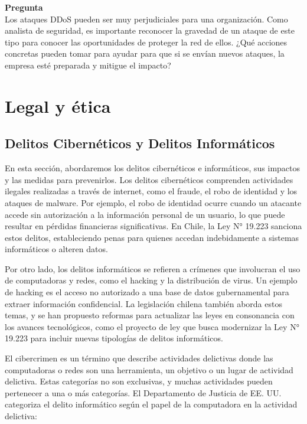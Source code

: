 

\textbf{Pregunta}\\
Los ataques DDoS pueden ser muy perjudiciales para una organización. Como analista de seguridad, es importante reconocer la gravedad de un ataque de este tipo para conocer las oportunidades de proteger la red de ellos. ¿Qué acciones concretas  pueden tomar para ayudar para que si se envían nuevos ataques, la empresa esté preparada y mitigue el impacto?


\section{Legal y ética}

\subsection{Delitos Cibernéticos y Delitos Informáticos}

En esta sección, abordaremos los delitos cibernéticos e informáticos, sus impactos y las medidas para prevenirlos. Los delitos cibernéticos comprenden actividades ilegales realizadas a través de internet, como el fraude, el robo de identidad y los ataques de malware. Por ejemplo, el robo de identidad ocurre cuando un atacante accede sin autorización a la información personal de un usuario, lo que puede resultar en pérdidas financieras significativas. En Chile, la Ley N° 19.223 sanciona estos delitos, estableciendo penas para quienes accedan indebidamente a sistemas informáticos o alteren datos.

Por otro lado, los delitos informáticos se refieren a crímenes que involucran el uso de computadoras y redes, como el hacking y la distribución de virus. Un ejemplo de hacking es el acceso no autorizado a una base de datos gubernamental para extraer información confidencial. La legislación chilena también aborda estos temas, y se han propuesto reformas para actualizar las leyes en consonancia con los avances tecnológicos, como el proyecto de ley que busca modernizar la Ley N° 19.223 para incluir nuevas tipologías de delitos informáticos.

El cibercrimen es un término que describe actividades delictivas donde las computadoras o redes son una herramienta, un objetivo o un lugar de actividad delictiva. Estas categorías no son exclusivas, y muchas actividades pueden pertenecer a una o más categorías. El Departamento de Justicia de EE. UU. categoriza el delito informático según el papel de la computadora en la actividad delictiva:


